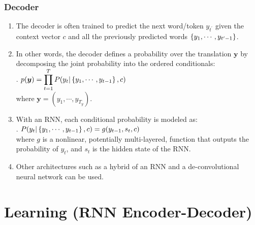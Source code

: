 \subsubsection*{Decoder}

\begin{enumerate}
    \item The decoder is often trained to predict the next word/token $y_{t^\prime}$ given the context vector $c$ and all the previously predicted words $\left\{y_1, \cdots , y_{t^\prime-1}\right\}$.
    \hfill \cite{arxiv/1409.0473/NMT-Jointly-Learning-Align-Translate}

    \item In other words, the decoder defines a probability over the translation $\bm{y}$ by decomposing the joint probability into the ordered conditionals:
    \hfill \cite{arxiv/1409.0473/NMT-Jointly-Learning-Align-Translate}
    \\[0.2cm]
    .\hfill
    $
        p(\bm{y}) = \displaystyle\prod_{t=1}^T P(y_t | \left\{y_1, \cdots , y_{t-1}\right\} , c)
    $
    \hfill \cite{arxiv/1409.0473/NMT-Jointly-Learning-Align-Translate}
    \\[0.2cm]
    where $\bm{y} = (y_1, \cdots , y_{T_y})$.
    \hfill \cite{arxiv/1409.0473/NMT-Jointly-Learning-Align-Translate}

    \item With an RNN, each conditional probability is modeled as:
    \hfill \cite{arxiv/1409.0473/NMT-Jointly-Learning-Align-Translate}
    \\[0.2cm]
    .\hfill
    $ P(y_t | \left\{y_1, \cdots , y_{t-1}\right\} , c) = g(y_{t-1}, s_t, c) $
    \hfill \cite{arxiv/1409.0473/NMT-Jointly-Learning-Align-Translate}
    \\[0.2cm]
    where $g$ is a nonlinear, potentially multi-layered, function that outputs the probability of $y_t$, and $s_t$ is the hidden state of the RNN.
    \hfill \cite{arxiv/1409.0473/NMT-Jointly-Learning-Align-Translate}

    \item Other architectures such as a hybrid of an RNN and a de-convolutional neural network can be used.
    \hfill \cite{arxiv/1409.0473/NMT-Jointly-Learning-Align-Translate}
\end{enumerate}









\section{Learning (RNN Encoder-Decoder)}

